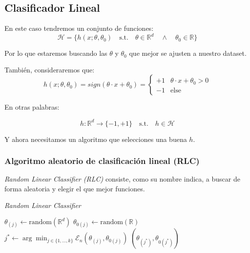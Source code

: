 \subsection{Clasificador Lineal}

En este caso tendremos un conjunto de funciones:
\[
    \mathcal{H} = \{
        h(x; \theta, \theta_0) \quad \text{s.t.} \quad \theta \in \mathbb{R} ^ d \quad \land \quad \theta_0 \in \mathbb{R}
    \}
\]

Por lo que estaremos buscando las $\theta$ y $\theta_0$ que mejor se ajusten a nuestro dataset.

También, consideraremos que:
\[
    h(x; \theta, \theta_0) = sign(\theta \cdot x + \theta_0) = \begin{cases}
        +1  &   \theta \cdot x + \theta_0 > 0   \\
        -1  &   \text{else}
    \end{cases}
\]

En otras palabras:

\[
    h: \mathbb{R}^d \to \{-1, +1\} \quad \text{s.t.} \quad h \in \mathcal{H}
\]

Y ahora necesitamos un algoritmo que selecciones una buena $h$.

\subsubsection{Algoritmo aleatorio de clasificación lineal (RLC)}

\textit{Random Linear Classifier (RLC)} consiste, como su nombre indica, a buscar de forma aleatoria y elegir el que mejor funciones.

\begin{algorithm}
    \caption{\textit{Random Linear Classifier}}
    \begin{algorithmic}[1]
                \State$\theta_{(j)} \gets \text{random}(\mathbb{R}^d)$ 
                \State$\theta_{0(j)} \gets \text{random}(\mathbb{R})$ 
            \EndFor{}
            \State$j^* \gets \arg\min_{j \in \{1, \dots, k\}} \mathcal{E}_n(\theta_{(j)}, \theta_{0(j)})$ 
            \State\Return$(\theta_{(j^*)}, \theta_{0(j^*)})$ 
    \EndProcedure$ $
    \end{algorithmic}
\end{algorithm}

